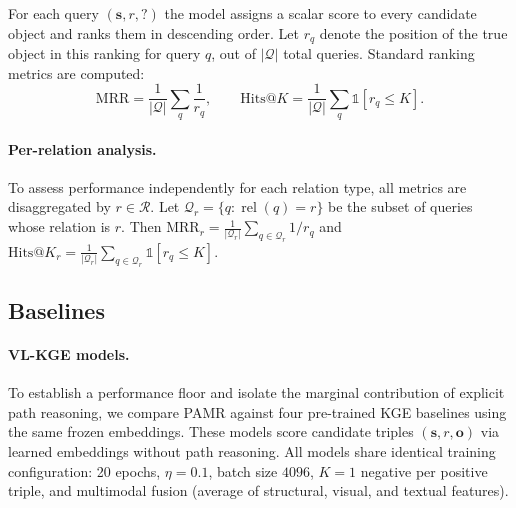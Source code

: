 For each query $(\mathbf{s}, r, ?)$ the model assigns a scalar score to every
candidate object and ranks them in descending order.  Let $r_q$ denote the
position of the true object in this ranking for query $q$, out of
$|\mathcal{Q}|$ total queries.  Standard ranking metrics are computed:
\begin{equation}
    \mathrm{MRR} = \frac{1}{|\mathcal{Q}|}\sum_{q} \frac{1}{r_q},
    \qquad
    \mathrm{Hits@}K = \frac{1}{|\mathcal{Q}|}\sum_{q} \mathds{1}[r_q \leq K].
\end{equation}

\vspace{-1em}
\paragraph{Per-relation analysis.}
To assess performance independently for each relation type, all metrics are
disaggregated by $r \in \mathcal{R}$.  Let $\mathcal{Q}_r = \{q : \operatorname{rel}(q) = r\}$
be the subset of queries whose relation is $r$.  Then
$\mathrm{MRR}_r = \frac{1}{|\mathcal{Q}_r|}\sum_{q \in \mathcal{Q}_r} 1/r_q$
and $\mathrm{Hits@}K_r = \frac{1}{|\mathcal{Q}_r|}\sum_{q \in \mathcal{Q}_r} \mathds{1}[r_q \leq K]$.

\vspace{-1em}
\subsection{Baselines}
\vspace{-1em}
\label{sec:baselines}

\vspace{-1em}
\paragraph{VL-KGE models.}
To establish a performance floor and isolate the marginal contribution of explicit path
reasoning, we compare PAMR against four pre-trained KGE baselines using the same frozen
embeddings.  These models score candidate triples
$(\mathbf{s}, r, \mathbf{o})$ via learned embeddings without path reasoning.
All models share identical training configuration: 20 epochs, $\eta = 0.1$, batch size
$4096$, $K = 1$ negative per positive triple, and multimodal fusion (average of structural,
visual, and textual features).

